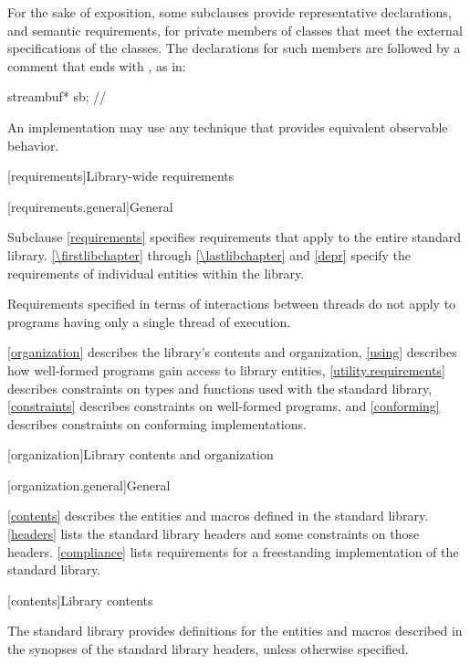 \pnum
For the sake of exposition,
some subclauses provide representative declarations, and semantic requirements, for
private members of classes that meet the external specifications of the classes.
The declarations for such members are
followed by a comment that ends with \expos, as in:
\begin{codeblock}
streambuf* sb;      // \expos
\end{codeblock}

\pnum
An implementation may use any technique that provides equivalent observable behavior.

[requirements]{Library-wide requirements}

[requirements.general]{General}

\pnum
Subclause \ref{requirements} specifies requirements that apply to the entire \Cpp{} standard library.
\ref{\firstlibchapter} through \ref{\lastlibchapter} and \ref{depr}
specify the requirements of individual entities within the library.

\pnum
Requirements specified in terms of interactions between threads do not apply to
programs having only a single thread of execution.

\pnum
\ref{organization} describes the library's contents and
organization, \ref{using} describes how well-formed \Cpp{} programs gain access to library
entities,
\ref{utility.requirements} describes constraints on types and functions used with
the \Cpp{} standard library,
\ref{constraints} describes constraints on well-formed \Cpp{} programs, and
\ref{conforming} describes constraints on conforming implementations.

[organization]{Library contents and organization}

[organization.general]{General}

\pnum
\ref{contents} describes the entities and macros defined in the \Cpp{} standard library.
\ref{headers} lists the standard library headers and some constraints on those headers.
\ref{compliance} lists requirements for a freestanding implementation of the \Cpp{}
standard library.

[contents]{Library contents}

\pnum
The \Cpp{} standard library provides definitions
for the entities and macros described in the synopses
of the \Cpp{} standard library headers,
unless otherwise specified.

